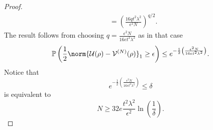 \begin{proof}
\begin{align*}
                                                                                                          &= \left(\frac{16qt^2 \lambda^2}{\epsilon^{2}N}\right)^{q/2}.
    \end{align*}
    The result follows from choosing \( q= \frac{\epsilon^{2}N }{16 et^{2}\lambda^{2}} \) as in that case
    \[ \mathbb{P}\left(\frac{1}{2}\norm{\mathcal{U}(\rho)-\mathcal{V}^{(N)}(\rho)}_{1}\geq \epsilon\right) \leq e^{-\frac{1}{2}\left(\frac{\epsilon^{2}N}{16et^2 \lambda^2}\right)} . \]
    Notice that 
    \[ e^{-\frac{1}{2}\left(\frac{\epsilon^{2}N}{16et^2 \lambda^2}\right)} \leq \delta  \]
    is equivalent to 
    \[ N \geq 32e \frac{t^2 \lambda^2}{\epsilon^{2}} \operatorname{ln}(\frac{1}{\delta}). \]
\end{proof}





